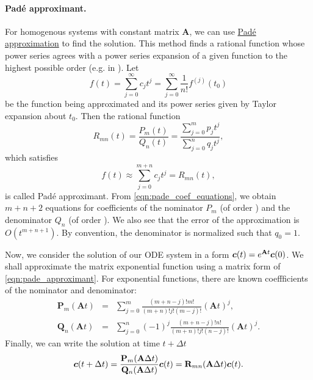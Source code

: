 \paragraph{Pad{\' e} approximant.}
For homogenous systems with constant matrix $\mathbf{A}$, we can use \hyperlink{IT::PadeApproximant}{Pad{\' e} approximation} 
to find the solution. This method finds a rational function whose power series agrees with a power series expansion of 
a given function to the highest possible order (e.g. in \cite{press_numerical_1992}).
Let
\[
  f(t) = \sum\limits_{j=0}^{\infty} c_j t^j = \sum\limits_{j=0}^{\infty} \frac{1}{n!}f^{(j)}(t_0)
\]
be the function being approximated and its power series given by Taylor expansion about $t_0$.
Then the rational function
\begin{equation} \label{eqn:pade_approximant}
R_{mn}(t) = \frac{P_m(t)}{Q_n(t)} = \frac{\sum\limits_{j=0}^{m} p_jt^j}{\sum\limits_{j=0}^{n} q_jt^j},
\end{equation}
which satisfies 
\begin{equation} \label{eqn:pade_coef_equations}
f(t)\approx \sum\limits_{j=0}^{m+n} c_j t^j = R_{mn}(t),
\end{equation}
is called Pad{\' e} approximant. From \eqref{eqn:pade_coef_equations}, we obtain $m+n+2$ equations for
coefficients of the nominator $P_m$ (of order ) and 
the denominator $Q_n$ (of order ). We also see that the error 
of the approximation is $O(t^{m+n+1})$. By convention, the denominator is normalized such that $q_0=1$.

Now, we consider the solution of our ODE system in a form $\mathbf{\boldsymbol{c}}(t)=e^{\mathbf{A}t}\mathbf{\boldsymbol{c}}(0)$. We shall 
approximate the matrix exponential function using a matrix form of \eqref{eqn:pade_approximant}. 
For exponential functions, there are known coeffficients of the nominator and denominator:
\begin{eqnarray}
  \mathbf{P}_m(\mathbf{A}t) &=& \sum\limits^{m}_{j=0}\frac{(m+n-j)!m!}{(m+n)!j!(m-j)!} (\mathbf{A}t)^j, \\
  \mathbf{Q}_n(\mathbf{A}t) &=& \sum\limits^{n}_{j=0} (-1)^j \frac{(m+n-j)!n!}{(m+n)!j!(n-j)!} (\mathbf{A}t)^j.
\end{eqnarray}
Finally, we can write the solution at time $t+\Delta t$
\begin{equation} \label{eqn:pade_solution}
\vc{c}(t+\Delta t) = \frac{\mathbf{P}_m(\mathbf{A}\Delta t)} {\mathbf{Q}_n(\mathbf{A}\Delta t)}\vc{c}(t) 
= \mathbf{R}_{mn}(\mathbf{A}\Delta t)\vc{c}(t).
\end{equation}

